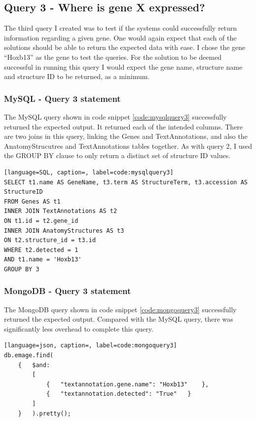 \subsection*{Query 3 - Where is gene X expressed?}\label{query3}
The third query I created was to test if the systems could successfully return information regarding a given gene. One would again expect that each of the solutions should be able to return the expected data with ease. I chose the gene ``Hoxb13'' as the gene to test the queries. For the solution to be deemed successful in running this query I would expect the gene name, structure name and structure ID to be returned, as a minimum.

\subsubsection*{MySQL - Query 3 statement}\label{mysqlquery3statement}
The MySQL query shown in code snippet \ref{code:mysqlquery3} successfully returned the expected output. It returned each of the intended columns. There are two joins in this query, linking the Genes and TextAnnotations, and also the AnatomyStrucutres and TextAnnotations tables together. As with query 2, I used the GROUP BY clause to only return a distinct set of structure ID values.

\begin{lstlisting}[language=SQL, caption=, label=code:mysqlquery3]
SELECT t1.name AS GeneName, t3.term AS StructureTerm, t3.accession AS StructureID
FROM Genes AS t1
INNER JOIN TextAnnotations AS t2
ON t1.id = t2.gene_id
INNER JOIN AnatomyStructures AS t3
ON t2.structure_id = t3.id
WHERE t2.detected = 1
AND t1.name = 'Hoxb13'
GROUP BY 3
\end{lstlisting}

\subsubsection*{MongoDB - Query 3 statement}\label{mongoquery3statement}
The MongoDB query shown in code snippet \ref{code:mongoquery3} successfully returned the expected output. Compared with the MySQL query, there was significantly less overhead to complete this query.

\begin{lstlisting}[language=json, caption=, label=code:mongoquery3]
db.emage.find(
	{	$and:
		[
			{	"textannotation.gene.name": "Hoxb13"	},
			{	"textannotation.detected": "True"	}
		]
	}	).pretty();
\end{lstlisting}

